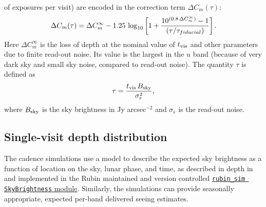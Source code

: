 \documentclass[PST,authoryear,toc]{lsstdoc}
\newcommand{\cm}{\ensuremath{C_m}}
\begin{document}
of exposures per visit) are encoded in the correction term $\Delta C_m(\tau)$:
\begin{equation}
\label{eq:dCm}
 \Delta C_m(\tau) = \Delta C^\infty_m - 1.25\,\log_{10}\left[1 + {10^{(0.8 \, \Delta C^\infty_m)} - 1 \over (\tau / \tau_{fiducial})}  \right].
\end{equation}
Here $\Delta C^\infty_m$ is the loss of depth at the nominal value of $t_{\rm vis}$ and
other parameters due to finite read-out noise. 
Its value is the largest in the $u$ band (because of very dark sky and small sky 
noise, compared to read-out noise). The quantity $\tau$ is defined as
\begin{equation}
        \tau =  {t_{\rm vis}\, B_{\rm sky} \over \sigma^2_{r}},
\end{equation}
where $B_{\rm sky}$ is the sky brightness in Jy arcsec$^{-2}$ and $\sigma_{r}$ is the read-out noise.  


\subsection{Single-visit depth distribution}\label{sec:singlevisit}

 
The cadence simulations use a model to describe the expected sky brightness as a function of location on the sky, lunar phase, and time, as described in depth in \href{https://www.osti.gov/biblio/1784946}{{\citet{osti_1784946}}} and implemented in the Rubin maintained and version controlled
\href{https://github.com/lsst/rubin_sim/tree/main/rubin_sim/skybrightness}{{\tt rubin\_sim SkyBrightness} module}. 
Similarly, the simulations can provide seasonally appropriate, expected per-band delivered seeing estimates. %
 
\end{document}
